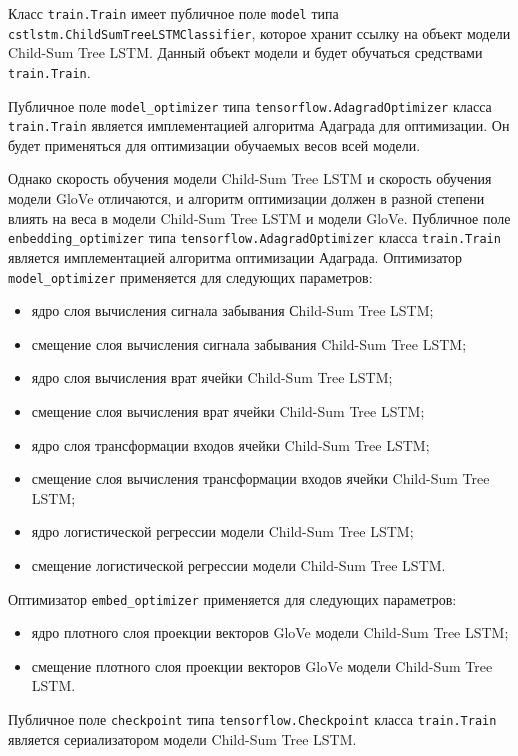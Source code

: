 Класс \texttt{train.Train} имеет публичное поле \texttt{model} типа \texttt{cstlstm.Child\-SumTreeLSTMClassifier}, которое хранит ссылку на объект модели Child-Sum Tree LSTM\@. Данный объект модели и будет обучаться средствами \texttt{train.Tra\-in}.

Публичное поле \texttt{model\_optimizer} типа \texttt{tensorflow.AdagradOptimiz\-er} класса \texttt{train.Train} является имплементацией алгоритма Адаграда для оптимизации. Он будет применяться для оптимизации обучаемых весов всей модели.

Однако скорость обучения модели Child-Sum Tree LSTM и скорость обучения модели GloVe отличаются, и алгоритм оптимизации должен в разной степени влиять на веса в модели Child-Sum Tree LSTM и модели GloVe. Публичное поле \texttt{enbedding\_optimizer} типа \texttt{tensorflow.AdagradOptimizer} класса \texttt{train.Train} является имплементацией алгоритма оптимизации Ада\-града. Оптимизатор \texttt{model\_optimizer} применяется для следующих параметров:
\begin{itemize}
\item ядро слоя вычисления сигнала забывания Сhild-Sum Tree LSTM\@;
\item смещение слоя вычисления сигнала забывания Child-Sum Tree LSTM\@;
\item ядро слоя вычисления врат ячейки Child-Sum Tree LSTM\@;
\item смещение слоя вычисления врат ячейки Child-Sum Tree LSTM\@;
\item ядро слоя трансформации входов ячейки Child-Sum Tree LSTM\@;
\item смещение слоя вычисления трансформации входов ячейки Child-Sum Tree LSTM\@;
\item ядро логистической регрессии модели Child-Sum Tree LSTM\@;
\item смещение логистической регрессии модели Child-Sum Tree LSTM\@.
\end{itemize}
Оптимизатор \texttt{embed\_optimizer} применяется для следующих параметров:
\begin{itemize}
\item ядро плотного слоя проекции векторов GloVe модели Child-Sum Tree LSTM\@;
\item смещение плотного слоя проекции векторов GloVe модели Child-Sum Tree LSTM\@.
\end{itemize}

Публичное поле \texttt{checkpoint} типа \texttt{tensorflow.Checkpoint} класса \texttt{tra\-in.Train} является сериализатором модели Child-Sum Tree LSTM\@.

